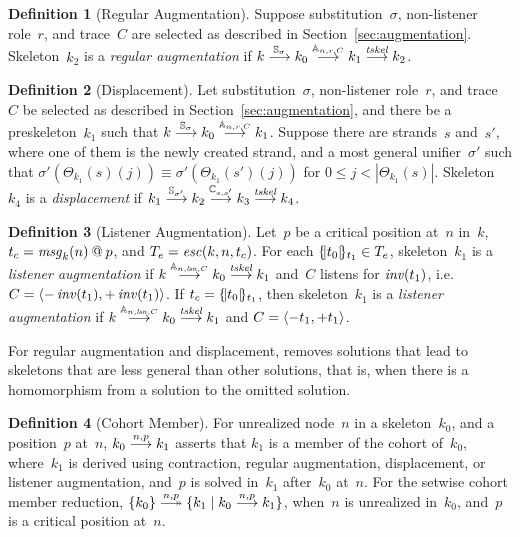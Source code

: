 \documentclass[12pt]{report}
\theoremstyle{definition}
\newtheorem{defn}{Definition}[chapter]
\newcommand{\msg}{\fn{msg}}
\newcommand{\lsn}{\fn{lsn}}
\begin{document}
\begin{defn}[Regular Augmentation]\label{def:regular augmentation}
Suppose substitution~$\sigma$, non-listener role~$r$, and trace~$C$
are selected as described in Section~\ref{sec:augmentation}.
Skeleton~$k_2$ is a \emph{regular
  augmentation} if
$k\stackrel{\mathbb S_\sigma}{\longrightarrow}k_0\stackrel{\mathbb A_{n,r,C}}{\longrightarrow}k_1
\stackrel{\operatorname{\mathit{tskel}}}{\longrightarrow}k_2$.
\end{defn}

\begin{defn}[Displacement]\label{def:displacement}
Let substitution~$\sigma$, non-listener role~$r$, and trace~$C$ be
selected as described in Section~\ref{sec:augmentation}, and there be
a preskeleton~$k_1$ such that
$k\stackrel{\mathbb S_\sigma}{\longrightarrow}k_0\stackrel{\mathbb A_{n,r,C}}{\longrightarrow}k_1$.
Suppose there are strands~$s$ and~$s'$, where one of them is the newly
created strand, and a most general unifier~$\sigma'$ such that
$\sigma'(\Theta_{k_1}(s)(j))\equiv \sigma'(\Theta_{k_1}(s')(j))$ for
$0\leq j<|\Theta_{k_1}(s)|$.  Skeleton~$k_4$ is a
\emph{displacement} if
$k_1\stackrel{\mathbb S_{\sigma'}}{\longrightarrow}k_2\stackrel{\mathbb C_{s,s'}}{\longrightarrow}k_3
\stackrel{\operatorname{\mathit{tskel}}}{\longrightarrow}k_4$.
\end{defn}

\begin{defn}[Listener Augmentation]\label{def:listener augmentation}
Let~$p$ be a critical position at~$n$ in~$k$, $t_c=\msg_k(n)\termat
p$, and $T_e= \operatorname{\mathit{esc}}(k,n,t_c)$.  For each $\{\!|t_0|\!\}_{t_1}\in T_e$,
skeleton~$k_1$ is a \emph{listener
  augmentation} if
$k\reduction{\ops{A}_{n,\lsn,C}}k_0\reduction{\fn{tskel}}k_1$ and~$C$
listens for $\operatorname{\mathit{inv}}(t_1)$,
i.e.\ $C=\langle\mathord -\operatorname{\mathit{inv}}(t_1),\mathord +\operatorname{\mathit{inv}}(t_1)\rangle$.  If
$t_c=\{\!|t_0|\!\}_{t_1}$, then skeleton~$k_1$ is a \emph{listener
  augmentation} if
$k\reduction{\ops{A}_{n,\lsn,C}}k_0\reduction{\fn{tskel}}k_1$ and
$C=\langle\mathord - t_1,\mathord + t_1\rangle$.
\end{defn}

For regular augmentation and displacement, {\cpsa} removes solutions
that lead to skeletons that are less general than other solutions,
that is, when there is a homomorphism from a solution to the omitted
solution.

\begin{defn}[Cohort Member]\label{def:cohort member}
For unrealized node~$n$ in a skeleton~$k_0$, and a position~$p$
at~$n$, $k_0\stackrel{n,p}{\longrightarrow}k_1$ asserts that $k_1$ is a member of the
cohort of~$k_0$, where~$k_1$ is derived using
contraction, regular augmentation, displacement, or listener
augmentation, and~$p$ is solved in~$k_1$ after~$k_0$ at~$n$.  For the
setwise cohort member reduction, $\{k_0\}\setreduction{n,p}\{k_1\mid
k_0\reduction{n,p}k_1\}$, when~$n$ is unrealized in~$k_0$, and~$p$ is
a critical position at~$n$.
\end{defn}
\end{document}
